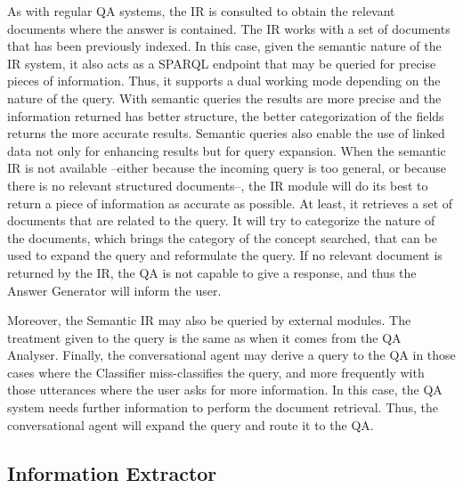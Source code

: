 As with regular \ac{QA} systems, the \ac{IR} is consulted to obtain the relevant documents where the answer is contained. The \ac{IR} works with a set of documents that has been previously indexed.
In this case, given the semantic nature of the \ac{IR} system, it also acts as a \ac{SPARQL} endpoint that may be queried for precise pieces of information. Thus, it supports a dual working mode depending on the nature of the query. With semantic queries the results are more precise and the information returned has better structure, the better categorization of the fields returns the more accurate results.  Semantic queries also enable the use of linked data not only for enhancing results but for query expansion.
When the semantic \ac{IR} is not available --either because the incoming query is too general, or because there is no relevant structured documents--, the \ac{IR} module will do its best to return a piece of information as accurate as possible. At least, it retrieves a set of documents that are related to the query. It will try to categorize the nature of the documents, which brings the category of the concept searched, that can be used to expand the query and reformulate the query.
If no relevant document is returned by the \ac{IR}, the \ac{QA} is not capable to give a response, and thus the Answer Generator will inform the user. 

Moreover, the Semantic \ac{IR} may also be queried by external modules. The treatment given to the query is the same as when it comes from the \ac{QA} Analyser. Finally, the conversational agent may derive a query to the \ac{QA} in those cases where the Classifier miss-classifies the query, and more frequently with those utterances where the user	 asks for more information. In this case, the \ac{QA} system needs further information to perform the document retrieval. Thus, the conversational agent will expand the query and route it to the \ac{QA}.


\subsection{Information Extractor}

